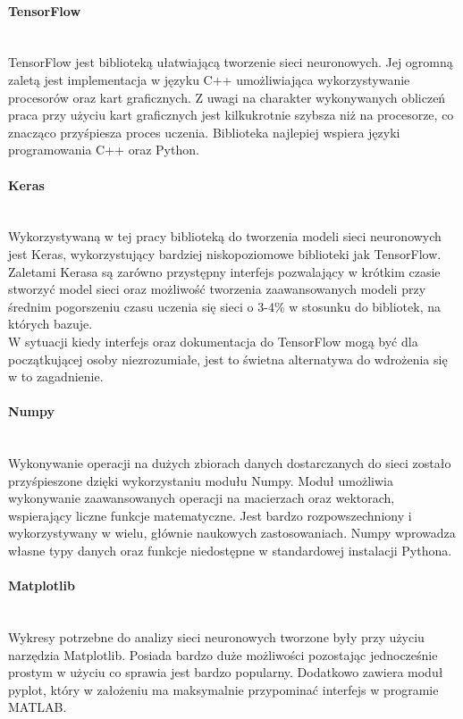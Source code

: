 \paragraph{TensorFlow} \mbox{}\\
TensorFlow jest biblioteką ułatwiającą tworzenie sieci neuronowych. Jej ogromną zaletą
jest implementacja w języku C++ umożliwiająca wykorzystywanie procesorów oraz kart graficznych.
Z uwagi na charakter  wykonywanych obliczeń praca przy użyciu kart graficznych jest
kilkukrotnie szybsza niż na procesorze, co znacząco przyśpiesza proces uczenia.
Biblioteka najlepiej wspiera języki programowania C++ oraz Python.

\paragraph{Keras} \mbox{}\\
Wykorzystywaną w tej pracy biblioteką do tworzenia modeli sieci neuronowych jest Keras,
wykorzystujący bardziej niskopoziomowe biblioteki jak TensorFlow.
Zaletami Kerasa są zarówno przystępny interfejs pozwalający w krótkim czasie stworzyć model
sieci oraz możliwość tworzenia zaawansowanych modeli przy średnim pogorszeniu czasu
uczenia się sieci o 3-4\% w stosunku do bibliotek, na których bazuje.\\
W sytuacji kiedy interfejs oraz dokumentacja do TensorFlow mogą być dla początkującej
osoby niezrozumiałe, jest to świetna alternatywa do wdrożenia się w to zagadnienie.

\paragraph{Numpy} \mbox{}\\
Wykonywanie operacji na dużych zbiorach danych dostarczanych do sieci zostało przyśpieszone
dzięki wykorzystaniu modułu Numpy. Moduł umożliwia wykonywanie zaawansowanych operacji na macierzach
oraz wektorach, wspierający liczne funkcje matematyczne. Jest bardzo rozpowszechniony
i wykorzystywany w wielu, głównie naukowych zastosowaniach. Numpy wprowadza własne
typy danych oraz funkcje niedostępne w standardowej instalacji Pythona.

\paragraph{Matplotlib} \mbox{}\\
Wykresy potrzebne do analizy sieci neuronowych tworzone były przy użyciu narzędzia Matplotlib.
Posiada bardzo duże możliwości pozostając jednocześnie prostym w użyciu co sprawia
jest bardzo popularny. Dodatkowo zawiera moduł pyplot, który w założeniu ma maksymalnie przypominać
interfejs w programie MATLAB.

